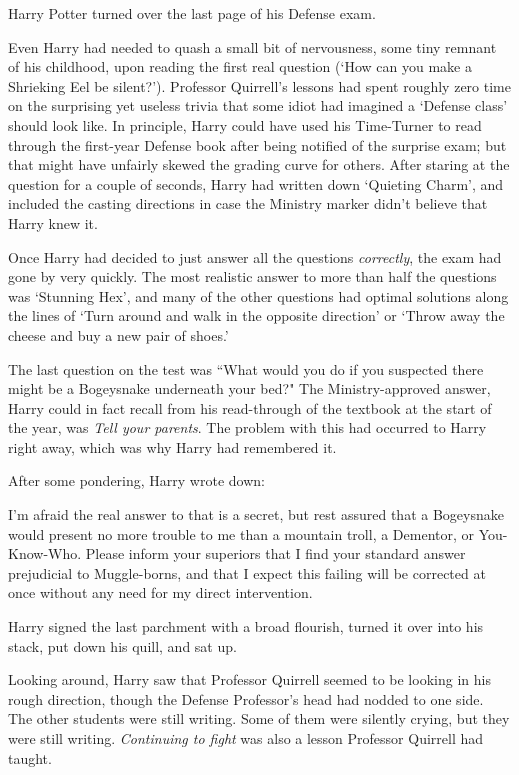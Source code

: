 \later

Harry Potter turned over the last page of his Defense exam.

Even Harry had needed to quash a small bit of nervousness, some tiny remnant of his childhood, upon reading the first real question (`How can you make a Shrieking Eel be silent?'). Professor Quirrell's lessons had spent roughly zero time on the surprising yet useless trivia that some idiot had imagined a `Defense class' should look like. In principle, Harry could have used his Time-Turner to read through the first-year Defense book after being notified of the surprise exam; but that might have unfairly skewed the grading curve for others. After staring at the question for a couple of seconds, Harry had written down `Quieting Charm', and included the casting directions in case the Ministry marker didn't believe that Harry knew it.

Once Harry had decided to just answer all the questions \emph{correctly}, the exam had gone by very quickly. The most realistic answer to more than half the questions was `Stunning Hex', and many of the other questions had optimal solutions along the lines of `Turn around and walk in the opposite direction' or `Throw away the cheese and buy a new pair of shoes.'

The last question on the test was ``What would you do if you suspected there might be a Bogeysnake underneath your bed?" The Ministry-approved answer, Harry could in fact recall from his read-through of the textbook at the start of the year, was \emph{Tell your parents}. The problem with this had occurred to Harry right away, which was why Harry had remembered it.

After some pondering, Harry wrote down:

\begin{writtenNote}
I'm afraid the real answer to that is a secret, but rest assured that a Bogeysnake would present no more trouble to me than a mountain troll, a Dementor, or You-Know-Who. Please inform your superiors that I find your standard answer prejudicial to Muggle-borns, and that I expect this failing will be corrected at once without any need for my direct intervention.
\end{writtenNote}

Harry signed the last parchment with a broad flourish, turned it over into his stack, put down his quill, and sat up.

Looking around, Harry saw that Professor Quirrell seemed to be looking in his rough direction, though the Defense Professor's head had nodded to one side. The other students were still writing. Some of them were silently crying, but they were still writing. \emph{Continuing to fight} was also a lesson Professor Quirrell had taught.

